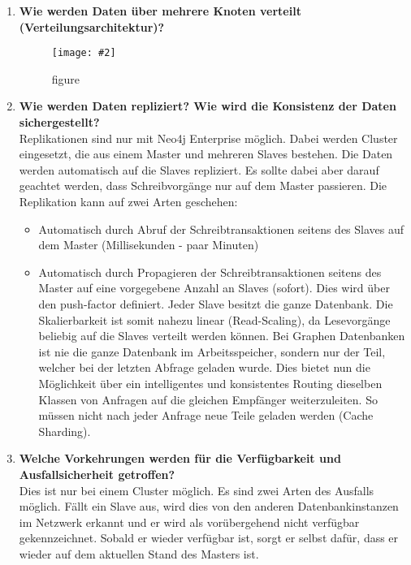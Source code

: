 \documentclass[a4paper,10pt,titlepage=false]{scrreprt}
\newcommand{\pic}[2][figure]{\begin{figure}[h]
 \centering
 \texttt{[image: \#2]}
 \caption{#1}
\end{figure}
}
\begin{document}
\begin{enumerate}
\item \textbf{Wie werden Daten über mehrere Knoten verteilt (Verteilungsarchitektur)?}\\
\pic{n4jvt.png}
\item \textbf{Wie werden Daten repliziert? Wie wird die Konsistenz der Daten sichergestellt?} \\
Replikationen sind nur mit Neo4j Enterprise möglich. Dabei werden Cluster eingesetzt, die aus einem Master und mehreren Slaves bestehen. Die Daten werden automatisch auf die Slaves repliziert. Es sollte dabei aber darauf geachtet werden, dass Schreibvorgänge nur auf dem Master passieren. Die Replikation kann auf zwei Arten geschehen:
\begin{itemize}
\item Automatisch durch Abruf der Schreibtransaktionen seitens des Slaves auf dem Master (Millisekunden - paar Minuten)
\item  Automatisch durch Propagieren der Schreibtransaktionen seitens des Master auf eine vorgegebene Anzahl an Slaves (sofort). Dies wird über den push-factor definiert.
Jeder Slave besitzt die ganze Datenbank. Die Skalierbarkeit ist somit nahezu linear (Read-Scaling), da Lesevorgänge beliebig auf die Slaves verteilt werden können.
Bei Graphen Datenbanken ist nie die ganze Datenbank im Arbeitsspeicher, sondern nur der Teil, welcher bei der letzten Abfrage geladen wurde. Dies bietet nun die Möglichkeit über ein intelligentes und konsistentes Routing dieselben Klassen von Anfragen auf die gleichen Empfänger weiterzuleiten. So müssen nicht nach jeder Anfrage neue Teile geladen werden (Cache Sharding).
\end{itemize}
\item \textbf{Welche Vorkehrungen werden für die Verfügbarkeit und Ausfallsicherheit getroffen?}\\
Dies ist nur bei einem Cluster möglich. Es sind zwei Arten des Ausfalls möglich.
Fällt ein Slave aus, wird dies von den anderen Datenbankinstanzen im Netzwerk erkannt und er wird als vorübergehend nicht verfügbar gekennzeichnet. Sobald er wieder verfügbar ist, sorgt er selbst dafür, dass er wieder auf dem aktuellen Stand des Masters ist.


\end{enumerate}
\end{document}
